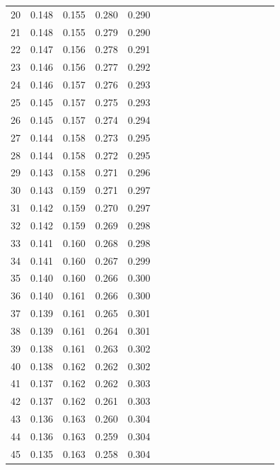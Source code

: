 \documentclass{report}
\begin{document}
\begin{appendices}
\begin{table}
\begin{tabular}{|c|cccc|cccc|cccc|cccc|}
20 & 0.148 & 0.155 & 0.280 & 0.290 & & & & & & & & & & & &\\
21 & 0.148 & 0.155 & 0.279 & 0.290 & & & & & & & & & & & &\\
22 & 0.147 & 0.156 & 0.278 & 0.291 & & & & & & & & & & & &\\
23 & 0.146 & 0.156 & 0.277 & 0.292 & & & & & & & & & & & &\\
24 & 0.146 & 0.157 & 0.276 & 0.293 & & & & & & & & & & & &\\
25 & 0.145 & 0.157 & 0.275 & 0.293 & & & & & & & & & & & &\\
26 & 0.145 & 0.157 & 0.274 & 0.294 & & & & & & & & & & & &\\
27 & 0.144 & 0.158 & 0.273 & 0.295 & & & & & & & & & & & &\\
28 & 0.144 & 0.158 & 0.272 & 0.295 & & & & & & & & & & & &\\
29 & 0.143 & 0.158 & 0.271 & 0.296 & & & & & & & & & & & &\\
30 & 0.143 & 0.159 & 0.271 & 0.297 & & & & & & & & & & & &\\
31 & 0.142 & 0.159 & 0.270 & 0.297 & & & & & & & & & & & &\\
32 & 0.142 & 0.159 & 0.269 & 0.298 & & & & & & & & & & & &\\
33 & 0.141 & 0.160 & 0.268 & 0.298 & & & & & & & & & & & &\\
34 & 0.141 & 0.160 & 0.267 & 0.299 & & & & & & & & & & & &\\
35 & 0.140 & 0.160 & 0.266 & 0.300 & & & & & & & & & & & &\\
36 & 0.140 & 0.161 & 0.266 & 0.300 & & & & & & & & & & & &\\
37 & 0.139 & 0.161 & 0.265 & 0.301 & & & & & & & & & & & &\\
38 & 0.139 & 0.161 & 0.264 & 0.301 & & & & & & & & & & & &\\
39 & 0.138 & 0.161 & 0.263 & 0.302 & & & & & & & & & & & &\\
40 & 0.138 & 0.162 & 0.262 & 0.302 & & & & & & & & & & & &\\
41 & 0.137 & 0.162 & 0.262 & 0.303 & & & & & & & & & & & &\\
42 & 0.137 & 0.162 & 0.261 & 0.303 & & & & & & & & & & & &\\
43 & 0.136 & 0.163 & 0.260 & 0.304 & & & & & & & & & & & &\\
44 & 0.136 & 0.163 & 0.259 & 0.304 & & & & & & & & & & & &\\
45 & 0.135 & 0.163 & 0.258 & 0.304 & & & & & & & & & & & &\\

\end{tabular}
\end{table}
\end{appendices}
\end{document}

